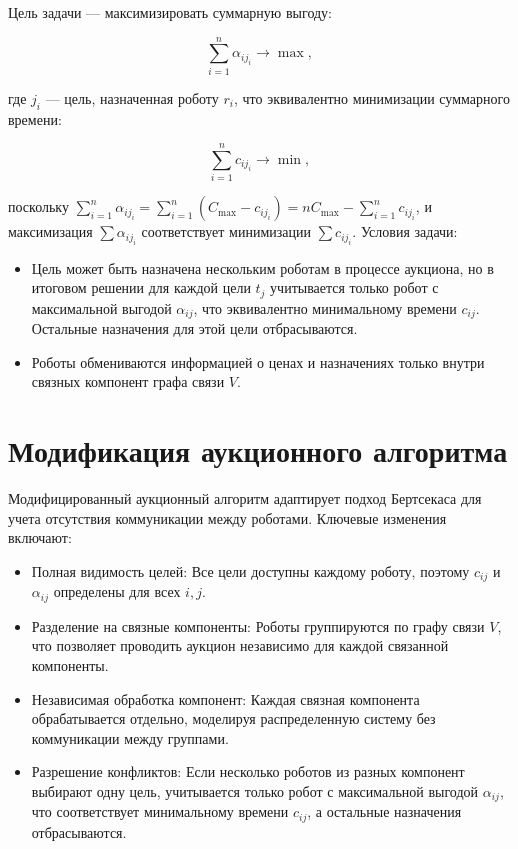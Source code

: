 Цель задачи --- максимизировать суммарную выгоду:

\[
\sum_{i=1}^n \alpha_{i j_i} \to \max,
\]

где \( j_i \) --- цель, назначенная роботу \( r_i \), что эквивалентно минимизации суммарного времени:

\[
\sum_{i=1}^n c_{i j_i} \to \min,
\]

поскольку \( \sum_{i=1}^n \alpha_{i j_i} = \sum_{i=1}^n (C_{\text{max}} - c_{i j_i}) = n C_{\text{max}} - \sum_{i=1}^n c_{i j_i} \), и максимизация \( \sum \alpha_{i j_i} \) соответствует минимизации \( \sum c_{i j_i} \). Условия задачи:

\begin{itemize}
    \item Цель может быть назначена нескольким роботам в процессе аукциона, но в итоговом решении для каждой цели \( t_j \) учитывается только робот с максимальной выгодой \( \alpha_{ij} \), что эквивалентно минимальному времени \( c_{ij} \). Остальные назначения для этой цели отбрасываются.
    \item Роботы обмениваются информацией о ценах и назначениях только внутри связных компонент графа связи \( V \).
\end{itemize}

\section{Модификация аукционного алгоритма}

Модифицированный аукционный алгоритм адаптирует подход Бертсекаса \cite{bertsekas1990} для учета отсутствия коммуникации между роботами. Ключевые изменения включают:

\begin{itemize}
    \item Полная видимость целей: Все цели доступны каждому роботу, поэтому \( c_{ij} \) и \( \alpha_{ij} \) определены для всех \( i, j \).
    \item Разделение на связные компоненты: Роботы группируются по графу связи \( V \), что позволяет проводить аукцион независимо для каждой связанной компоненты.
    \item Независимая обработка компонент: Каждая связная компонента обрабатывается отдельно, моделируя распределенную систему без коммуникации между группами.
    \item Разрешение конфликтов: Если несколько роботов из разных компонент выбирают одну цель, учитывается только робот с максимальной выгодой \( \alpha_{ij} \), что соответствует минимальному времени \( c_{ij} \), а остальные назначения отбрасываются.
\end{itemize}

